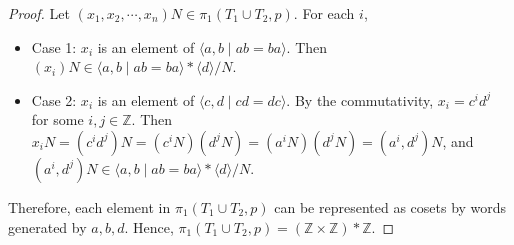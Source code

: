 \documentclass[12pt, psamsfonts]{amsart}
\theoremstyle{definition}
\theoremstyle{remark}
\numberwithin{equation}{section}
\begin{document}
\begin{proof}
  Let $(x_1, x_2, \cdots, x_n)N \in \pi_1(T_1 \cup T_2, p)$.
  For each $i$,
  \begin{itemize}
    \item
      Case 1: $x_i$ is an element of $\langle a, b \mid ab = ba \rangle$.
      Then $(x_i)N \in \langle a, b \mid ab = ba \rangle * \langle d \rangle / N$.
    \item
      Case 2: $x_i$ is an element of $\langle c, d \mid cd = dc \rangle$.
      By the commutativity, $x_i = c^id^j$ for some $i, j \in \mathbb{Z}$.
      Then $x_iN = (c^id^j)N = (c^iN)(d^jN) = (a^iN)(d^jN) = (a^i, d^j)N$, and $(a^i, d^j)N \in \langle a, b \mid ab = ba \rangle * \langle d \rangle / N$.
  \end{itemize}
  Therefore, each element in $\pi_1(T_1 \cup T_2, p)$ can be represented as cosets by words generated by $a, b, d$.
  Hence, $\pi_1(T_1 \cup T_2, p) = (\mathbb{Z} \times \mathbb{Z}) * \mathbb{Z}$.
\end{proof}
\end{document}
